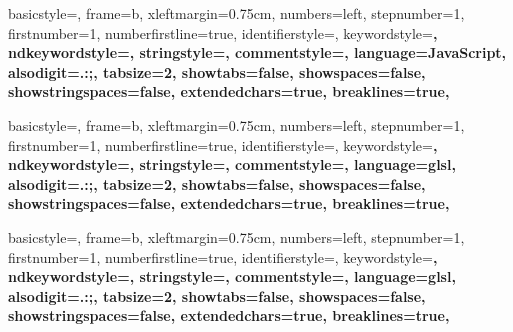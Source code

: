  {%
  basicstyle={\footnotesize\ttfamily},
  frame=b,
  xleftmargin={0.75cm},
  numbers=left,
  stepnumber=1,
  firstnumber=1,
  numberfirstline=true,
  identifierstyle=\color{black},
  keywordstyle=\color{blue}\bfseries,
  ndkeywordstyle=\color{editorGreen}\bfseries,
  stringstyle=\color{editorOcher}\ttfamily,
  commentstyle=\color{brown}\ttfamily,
  language=JavaScript,
  alsodigit={.:;},
  tabsize=2,
  showtabs=false,
  showspaces=false,
  showstringspaces=false,
  extendedchars=true,
  breaklines=true,
}

 {%
  basicstyle={\footnotesize\ttfamily},
  frame=b,
  xleftmargin={0.75cm},
  numbers=left,
  stepnumber=1,
  firstnumber=1,
  numberfirstline=true,
  identifierstyle=\color{black},
  keywordstyle=\color{blue}\bfseries,
  ndkeywordstyle=\color{editorGreen}\bfseries,
  stringstyle=\color{editorOcher}\ttfamily,
  commentstyle=\color{brown}\ttfamily,
  language=glsl,
  alsodigit={.:;},
  tabsize=2,
  showtabs=false,
  showspaces=false,
  showstringspaces=false,
  extendedchars=true,
  breaklines=true,
}

 {%
  basicstyle={\footnotesize\ttfamily},
  frame=b,
  xleftmargin={0.75cm},
  numbers=left,
  stepnumber=1,
  firstnumber=1,
  numberfirstline=true,
  identifierstyle=\color{black},
  keywordstyle=\color{blue}\bfseries,
  ndkeywordstyle=\color{editorGreen}\bfseries,
  stringstyle=\color{editorOcher}\ttfamily,
  commentstyle=\color{brown}\ttfamily,
  language=glsl,
  alsodigit={.:;},
  tabsize=2,
  showtabs=false,
  showspaces=false,
  showstringspaces=false,
  extendedchars=true,
  breaklines=true,
}

